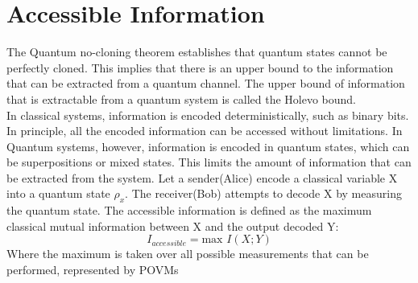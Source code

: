 \section{Accessible Information}
The Quantum no-cloning theorem establishes that quantum states cannot be perfectly cloned. This implies that there is an upper bound to the information that can be extracted from a quantum channel. The upper bound of information that is extractable from a quantum system is called the Holevo bound.\\
In classical systems, information is encoded deterministically, such as binary bits. In principle, all the encoded information can be accessed without limitations. In Quantum systems, however, information is encoded in quantum states, which can be superpositions or mixed states. This limits the amount of information that can be extracted from the system.
\newline
Let a sender(Alice) encode a classical variable X into a quantum state $\rho_x$. The receiver(Bob) attempts to decode X by measuring the quantum state. The accessible information is defined as the maximum classical mutual information between X and the output decoded Y:
\[
I_{accessible} = \text{max } I(X;Y)
\]
Where the maximum is taken over all possible measurements that can  be performed, represented by POVMs

